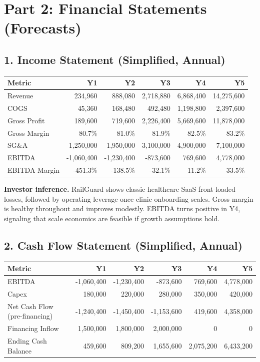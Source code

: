 \documentclass[11pt]{article}
\begin{document}
\section*{Part 2: Financial Statements (Forecasts)}
\subsection*{1. Income Statement (Simplified, Annual)}
\begin{center}
\begin{tabular}{lrrrrr}
\toprule
\textbf{Metric} & \textbf{Y1} & \textbf{Y2} & \textbf{Y3} & \textbf{Y4} & \textbf{Y5} \\
\midrule
Revenue & 234,960 & 888,080 & 2,718,880 & 6,868,400 & 14,275,600 \\
COGS & 45,360 & 168,480 & 492,480 & 1,198,800 & 2,397,600 \\
Gross Profit & 189,600 & 719,600 & 2,226,400 & 5,669,600 & 11,878,000 \\
Gross Margin & 80.7\% & 81.0\% & 81.9\% & 82.5\% & 83.2\% \\
SG\&A & 1,250,000 & 1,950,000 & 3,100,000 & 4,900,000 & 7,100,000 \\
EBITDA & -1,060,400 & -1,230,400 & -873,600 & 769,600 & 4,778,000 \\
EBITDA Margin & -451.3\% & -138.5\% & -32.1\% & 11.2\% & 33.5\% \\
\bottomrule
\end{tabular}
\end{center}

\noindent\textbf{Investor inference.} RailGuard shows classic healthcare SaaS front-loaded losses, followed by operating leverage once clinic onboarding scales. Gross margin is healthy throughout and improves modestly. EBITDA turns positive in Y4, signaling that scale economics are feasible if growth assumptions hold.

\subsection*{2. Cash Flow Statement (Simplified, Annual)}
\begin{center}
\begin{tabular}{lrrrrr}
\toprule
\textbf{Metric} & \textbf{Y1} & \textbf{Y2} & \textbf{Y3} & \textbf{Y4} & \textbf{Y5} \\
\midrule
EBITDA & -1,060,400 & -1,230,400 & -873,600 & 769,600 & 4,778,000 \\
Capex & 180,000 & 220,000 & 280,000 & 350,000 & 420,000 \\
Net Cash Flow (pre-financing) & -1,240,400 & -1,450,400 & -1,153,600 & 419,600 & 4,358,000 \\
Financing Inflow & 1,500,000 & 1,800,000 & 2,000,000 & 0 & 0 \\
Ending Cash Balance & 459,600 & 809,200 & 1,655,600 & 2,075,200 & 6,433,200 \\
\bottomrule
\end{tabular}
\end{center}
\end{document}
